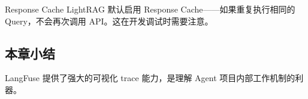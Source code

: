 \begin{warningbox}{Response Cache}
LightRAG 默认启用 Response Cache——如果重复执行相同的 Query，不会再次调用 API。这在开发调试时需要注意。
\end{warningbox}

\subsection{本章小结}

LangFuse 提供了强大的可视化 trace 能力，是理解 Agent 项目内部工作机制的利器。

